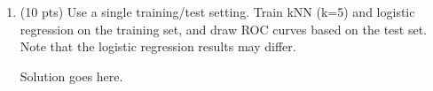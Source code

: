 \documentclass[a4paper]{article}
\theoremstyle{definition}
\newenvironment{soln}{
    \leavevmode\color{blue}\ignorespaces
}{}
\begin{document}
\begin{enumerate}
	
	\item (10 pts) Use a single training/test setting. Train kNN (k=5) and logistic regression on the training set, and draw ROC curves based on the test set. \\
	Note that the logistic regression results may differ.
	
	\begin{soln}  Solution goes here. \end{soln}
	
\end{enumerate}

\end{document}
